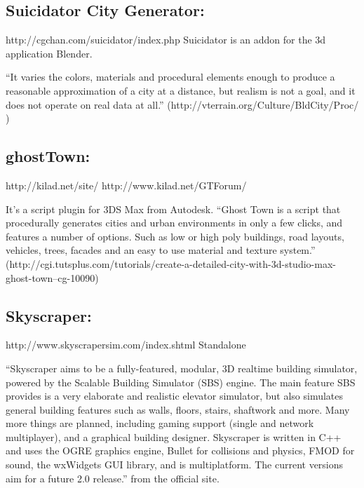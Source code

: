 \subsection{Suicidator City Generator:} %
\label{sub:suicidator_city_generator}


http://cgchan.com/suicidator/index.php
Suicidator is an addon for the 3d application Blender.


“It varies the colors, materials and procedural elements enough to produce a reasonable approximation of a city at a distance, but realism is not a goal, and it does not operate on real data at all.” (http://vterrain.org/Culture/BldCity/Proc/ )


\subsection{ghostTown:} %
\label{sub:ghosttown}

http://kilad.net/site/
http://www.kilad.net/GTForum/


It’s a script plugin for 3DS Max from Autodesk.
“Ghost Town is a script that procedurally generates cities and urban environments in only a few clicks, and features a number of options. Such as low or high poly buildings, road layouts, vehicles, trees, facades and an easy to use material and texture system.” (http://cgi.tutsplus.com/tutorials/create-a-detailed-city-with-3d-studio-max-ghost-town--cg-10090)


\subsection{Skyscraper:} %
\label{sub:skyscraper}

http://www.skyscrapersim.com/index.shtml
Standalone


“Skyscraper aims to be a fully-featured, modular, 3D realtime building simulator, powered by the Scalable Building Simulator (SBS) engine. The main feature SBS provides is a very elaborate and realistic elevator simulator, but also simulates general building features such as walls, floors, stairs, shaftwork and more. Many more things are planned, including gaming support (single and network multiplayer), and a graphical building designer. Skyscraper is written in C++ and uses the OGRE graphics engine, Bullet for collisions and physics, FMOD for sound, the wxWidgets GUI library, and is multiplatform. The current versions aim for a future 2.0 release.” from the official site.

